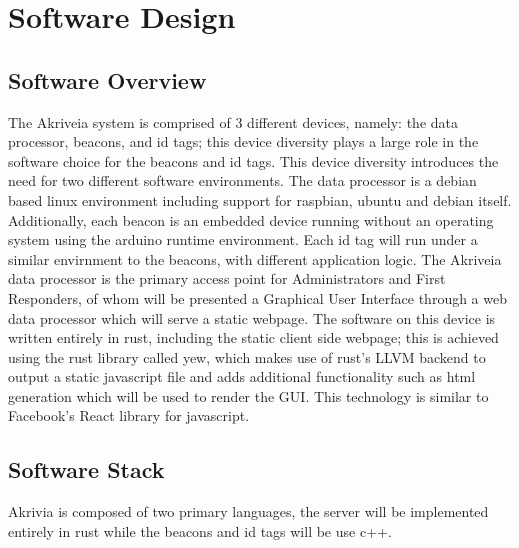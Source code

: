 

\setcounter{section}{5}
\section{Software Design}
\bigskip



\subsection{Software Overview}
The Akriveia system is comprised of 3 different devices, namely: the data processor, beacons, and id tags; this device diversity plays a large role in the software choice for the beacons and id tags.
This device diversity introduces the need for two different software environments. The data processor is a debian based linux environment including support for raspbian, ubuntu and debian itself.
Additionally, each beacon is an embedded device running without an operating system using the arduino runtime environment.
Each id tag will run under a similar envirnment to the beacons, with different application logic.
The Akriveia data processor is the primary access point for Administrators and First Responders, of whom will be presented a Graphical User Interface through a web data processor which will serve a static webpage.
The software on this device is written entirely in rust, including the static client side webpage; this is achieved using the rust library called yew, which makes use of rust's LLVM backend to output a static javascript file and adds additional functionality such as html generation which will be used to render the GUI.
This technology is similar to Facebook's React library for javascript.

\bigskip
\subsection{Software Stack}
Akrivia is composed of two primary languages, the server will be implemented entirely in rust while the beacons and id tags will be use c++.

